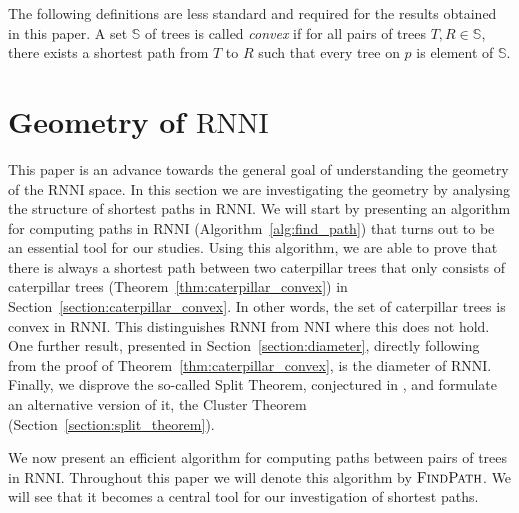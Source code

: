 \documentclass{amsart}
\newcommand{\nni}{\mathrm{NNI}}
\newcommand{\rnni}{\mathrm{RNNI}}
\newcommand{\findpath}{\textsc{FindPath}}
\begin{document}

The following definitions are less standard and required for the results obtained in this paper.
A set $\mathbb S$ of trees is called \emph{convex} if for all pairs of trees $T,R \in \mathbb S$, there exists a shortest path from $T$ to $R$ such that every tree on $p$ is element of $\mathbb S$.

\section{Geometry of $\rnni$}
\label{section:geometry}

This paper is an advance towards the general goal of understanding the geometry of the $\rnni$ space.
In this section we are investigating the geometry by analysing the structure of shortest paths in $\rnni$.
We will start by presenting an algorithm for computing paths in $\rnni$ (Algorithm~\ref{alg:find_path}) that turns out to be an essential tool for our studies.
Using this algorithm, we are able to prove that there is always a shortest path between two caterpillar trees that only consists of caterpillar trees (Theorem~\ref{thm:caterpillar_convex}) in Section~\ref{section:caterpillar_convex}.
In other words, the set of caterpillar trees is convex in $\rnni$.
This distinguishes $\rnni$ from $\nni$ where this does not hold.
One further result, presented in Section~\ref{section:diameter}, directly following from the proof of Theorem~\ref{thm:caterpillar_convex}, is the diameter of $\rnni$.
Finally, we disprove the so-called Split Theorem, conjectured in \autocite{Gavryushkin2017}, and formulate an alternative version of it, the Cluster Theorem (Section~\ref{section:split_theorem}).

We now present an efficient algorithm for computing paths between pairs of trees in $\rnni$.
Throughout this paper we will denote this algorithm by $\findpath$.
We will see that it becomes a central tool for our investigation of shortest paths.
\end{document}
